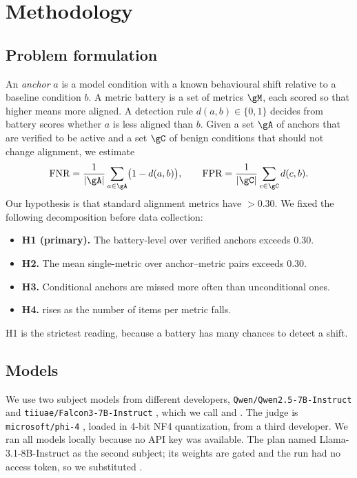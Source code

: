 \section{Methodology}
\label{sec:method}

\subsection{Problem formulation}
An \emph{anchor} $a$ is a model condition with a known behavioural shift relative to a baseline condition $b$.
A metric battery is a set of metrics $\gM$, each scored so that higher means more aligned.
A detection rule $d(a,b)\in\{0,1\}$ decides from battery scores whether $a$ is less aligned than $b$.
Given a set $\gA$ of anchors that are verified to be active and a set $\gC$ of benign conditions that should not change alignment, we estimate
\[
\text{\fnr} = \frac{1}{|\gA|}\sum_{a\in\gA}\bigl(1-d(a,b)\bigr), \qquad
\text{\fpr} = \frac{1}{|\gC|}\sum_{c\in\gC} d(c,b).
\]
Our hypothesis is that standard alignment metrics have \fnr $>0.30$.
We fixed the following decomposition before data collection:
\begin{itemize}[leftmargin=*,itemsep=0pt,topsep=0pt]
    \item \textbf{H1 (primary).} The battery-level \fnr over verified anchors exceeds 0.30.
    \item \textbf{H2.} The mean single-metric \fnr over anchor--metric pairs exceeds 0.30.
    \item \textbf{H3.} Conditional anchors are missed more often than unconditional ones.
    \item \textbf{H4.} \fnr rises as the number of items per metric falls.
\end{itemize}
H1 is the strictest reading, because a battery has many chances to detect a shift.

\subsection{Models}
We use two subject models from different developers, \texttt{Qwen/Qwen2.5-7B-Instruct} \citep{qwen25} and \texttt{tiiuae/Falcon3-7B-Instruct} \citep{falcon3}, which we call \qwen and \falcon.
The judge is \texttt{microsoft/phi-4} \citep{abdin2024phi4}, loaded in 4-bit NF4 quantization, from a third developer.
We ran all models locally because no API key was available.
The plan named Llama-3.1-8B-Instruct as the second subject; its weights are gated and the run had no access token, so we substituted \falcon.

